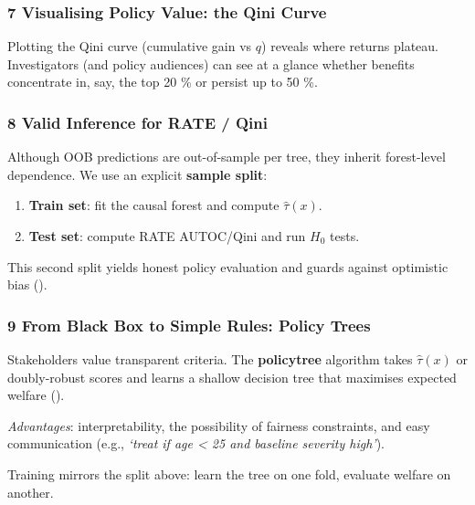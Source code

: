 \documentclass[
  single column]{article}
\providecommand{\tightlist}{%
  \setlength{\itemsep}{0pt}\setlength{\parskip}{0pt}}
\begin{document}
\subsubsection{7 Visualising Policy Value: the Qini
Curve}\label{visualising-policy-value-the-qini-curve}

Plotting the Qini curve (cumulative gain vs \(q\)) reveals where returns
plateau. Investigators (and policy audiences) can see at a glance
whether benefits concentrate in, say, the top 20 \% or persist up to 50
\%.

\subsubsection{8 Valid Inference for RATE /
Qini}\label{valid-inference-for-rate-qini}

Although OOB predictions are out-of-sample per tree, they inherit
forest-level dependence. We use an explicit \textbf{sample split}:

\begin{enumerate}
\def\labelenumi{\arabic{enumi}.}
\tightlist
\item
  \textbf{Train set}: fit the causal forest and compute
  \(\widehat{\tau}(x)\).
\item
  \textbf{Test set}: compute RATE AUTOC/Qini and run \(H_0\) tests.
\end{enumerate}

This second split yields honest policy evaluation and guards against
optimistic bias ().

\subsubsection{9 From Black Box to Simple Rules: Policy
Trees}\label{from-black-box-to-simple-rules-policy-trees}

Stakeholders value transparent criteria. The \textbf{policytree}
algorithm takes \(\widehat{\tau}(x)\) or doubly-robust scores and learns
a shallow decision tree that maximises expected welfare
().

\emph{Advantages}: interpretability, the possibility of fairness
constraints, and easy communication (e.g., \emph{`treat if age
\textless{} 25 and baseline severity high'}).

Training mirrors the split above: learn the tree on one fold, evaluate
welfare on another.
\end{document}
